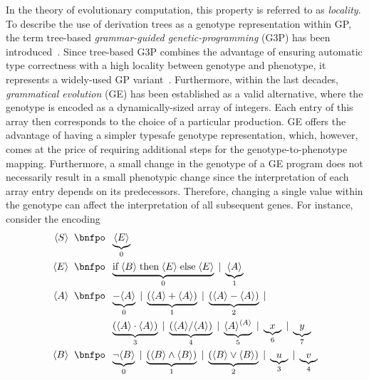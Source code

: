 In the theory of evolutionary computation, this property is referred to as \emph{locality}.
To describe the use of derivation trees as a genotype representation within GP, the term tree-based \emph{grammar-guided genetic-programming} (G3P) has been introduced~\cite{mckay2010grammar,whigham1995grammatically}.
Since tree-based G3P combines the advantage of ensuring automatic type correctness with a high locality between genotype and phenotype, it represents a widely-used GP variant~\cite{mckay2010grammar}.
Furthermore, within the last decades, \emph{grammatical evolution} (GE) has been established as a valid alternative, where the genotype is encoded as a dynamically-sized array of integers. 
Each entry of this array then corresponds to the choice of a particular production.
GE offers the advantage of having a simpler typesafe genotype representation, which, however, comes at the price of requiring additional steps for the genotype-to-phenotype mapping.
Furthermore, a small change in the genotype of a GE program does not necessarily result in a small phenotypic change since the interpretation of each array entry depends on its predecessors.
Therefore, changing a single value within the genotype can affect the interpretation of all subsequent genes.
For instance, consider the encoding
\begin{equation}
	\begin{split}
		\ps S \; \; \bnfpo & \; \; \underbrace{\ps E}_{0} \\
		\ps E \; \; \bnfpo & \; \; \underbrace{\text{if} \; \ps B \; \text{then} \; \ps E \; \text{else} \; \ps E}_{0} \; | \; \underbrace{\ps A}_{1} \\
		\ps A \; \; \bnfpo & \; \; \underbrace{-\ps A}_0 \; | \; \underbrace{(\ps A + \ps A)}_{1} \; | \; \underbrace{(\ps A - \ps A)}_2 \; |   \\  
		&  \; \; \underbrace{(\ps A \cdot \ps A)}_{3} \; | \; \underbrace{(\ps A / \ps A)}_{4} \; | \; \underbrace{\ps{A}^{\ps A}}_{5} \; | \; \underbrace{x}_{6} \; | \; \underbrace{y}_{7} \\
		\ps B \; \; \bnfpo & \; \; \underbrace{\neg \ps B}_{0} \; | \; \underbrace{(\ps B \wedge \ps B)}_{1} \; | \; \underbrace{(\ps B \vee \ps B)}_{2} \; | \; \underbrace{u}_3 \; | \; \underbrace{v}_4
	\end{split}
	\label{eq:gp-example-grammar-ge-encoding}
\end{equation}
